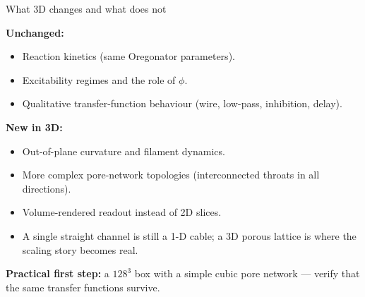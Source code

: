 \documentclass[aspectratio=169,11pt]{beamer}
\begin{document}
\begin{frame}{What 3D changes and what does not}

\textbf{Unchanged:}
\begin{itemize}
    \item Reaction kinetics (same Oregonator parameters).
    \item Excitability regimes and the role of $\phi$.
    \item Qualitative transfer-function behaviour (wire, low-pass, inhibition, delay).
\end{itemize}

\vspace{0.3cm}
\textbf{New in 3D:}
\begin{itemize}
    \item Out-of-plane curvature and filament dynamics.
    \item More complex pore-network topologies (interconnected throats in all directions).
    \item Volume-rendered readout instead of 2D slices.
    \item A single straight channel is still a 1-D cable; a 3D porous lattice is where the scaling story becomes real.
\end{itemize}

\vspace{0.3cm}
\textbf{Practical first step:} a $128^3$ box with a simple cubic pore network --- verify that the same transfer functions survive.

\end{frame}
\end{document}
